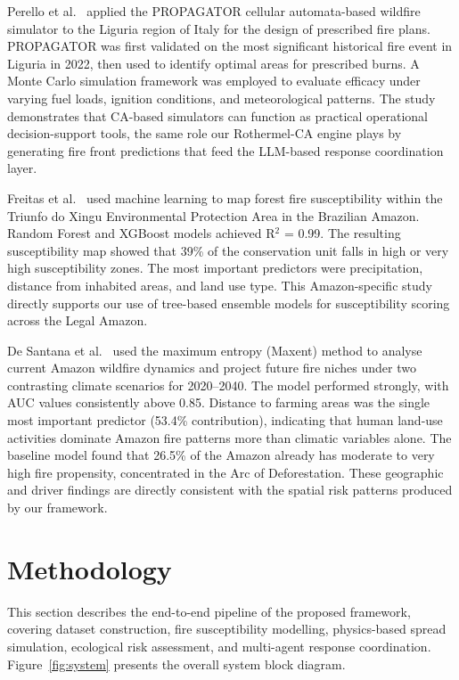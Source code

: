 \documentclass[12pt,a4paper]{article}
\begin{document}
Perello et al.~\cite{perello2024} applied the PROPAGATOR cellular automata-based wildfire simulator to the Liguria region of Italy for the design of prescribed fire plans. PROPAGATOR was first validated on the most significant historical fire event in Liguria in 2022, then used to identify optimal areas for prescribed burns. A Monte Carlo simulation framework was employed to evaluate efficacy under varying fuel loads, ignition conditions, and meteorological patterns. The study demonstrates that CA-based simulators can function as practical operational decision-support tools, the same role our Rothermel-CA engine plays by generating fire front predictions that feed the LLM-based response coordination layer.

Freitas et al.~\cite{freitas2024} used machine learning to map forest fire susceptibility within the Triunfo do Xingu Environmental Protection Area in the Brazilian Amazon. Random Forest and XGBoost models achieved R$^2$ = 0.99. The resulting susceptibility map showed that 39\% of the conservation unit falls in high or very high susceptibility zones. The most important predictors were precipitation, distance from inhabited areas, and land use type. This Amazon-specific study directly supports our use of tree-based ensemble models for susceptibility scoring across the Legal Amazon.

De Santana et al.~\cite{desantana2024} used the maximum entropy (Maxent) method to analyse current Amazon wildfire dynamics and project future fire niches under two contrasting climate scenarios for 2020--2040. The model performed strongly, with AUC values consistently above 0.85. Distance to farming areas was the single most important predictor (53.4\% contribution), indicating that human land-use activities dominate Amazon fire patterns more than climatic variables alone. The baseline model found that 26.5\% of the Amazon already has moderate to very high fire propensity, concentrated in the Arc of Deforestation. These geographic and driver findings are directly consistent with the spatial risk patterns produced by our framework.

\section{Methodology}

This section describes the end-to-end pipeline of the proposed framework, covering dataset construction, fire susceptibility modelling, physics-based spread simulation, ecological risk assessment, and multi-agent response coordination. Figure~\ref{fig:system} presents the overall system block diagram.
\end{document}
